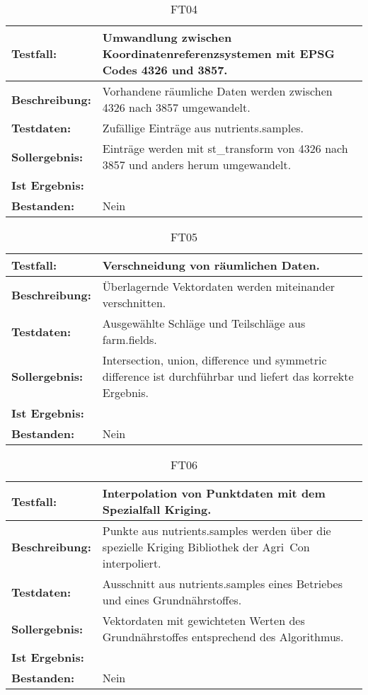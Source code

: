 \begin{table}[h!]
\centering
\small
\begin{tabular}{p{2.8cm}|p{12cm}}
\textbf{Testfall:} & Umwandlung zwischen Koordinatenreferenzsystemen mit EPSG Codes 4326 und 3857. \\ \hline
\textbf{Beschreibung:} & Vorhandene räumliche Daten werden zwischen 4326 nach 3857 umgewandelt. \\ \hline
\textbf{Testdaten:} & Zufällige Einträge aus nutrients.samples. \\ \hline
\textbf{Sollergebnis:} & Einträge werden mit st\_{}transform von 4326 nach 3857 und anders herum umgewandelt. \\ \hline
\textbf{Ist Ergebnis:} &  \\ \hline
\textbf{Bestanden:} & Nein \\
\end{tabular}
\caption*{FT04}
\end{table}

\begin{table}[h!]
\centering
\small
\begin{tabular}{p{2.8cm}|p{12cm}}
\textbf{Testfall:} & Verschneidung von räumlichen Daten. \\ \hline
\textbf{Beschreibung:} & Überlagernde Vektordaten werden miteinander verschnitten. \\ \hline
\textbf{Testdaten:} & Ausgewählte Schläge und Teilschläge aus farm.fields. \\ \hline
\textbf{Sollergebnis:} & Intersection, union, difference und symmetric difference ist durchführbar und liefert das korrekte Ergebnis. \\ \hline
\textbf{Ist Ergebnis:} &  \\ \hline
\textbf{Bestanden:} & Nein \\
\end{tabular}
\caption*{FT05}
\end{table}

\begin{table}[h!]
\centering
\small
\begin{tabular}{p{2.8cm}|p{12cm}}
\textbf{Testfall:} & Interpolation von Punktdaten mit dem Spezialfall Kriging. \\ \hline
\textbf{Beschreibung:} & Punkte aus nutrients.samples werden über die spezielle Kriging Bibliothek der Agri~Con interpoliert. \\ \hline
\textbf{Testdaten:} & Ausschnitt aus nutrients.samples eines Betriebes und eines Grundnährstoffes. \\ \hline
\textbf{Sollergebnis:} & Vektordaten mit gewichteten Werten des Grundnährstoffes entsprechend des Algorithmus. \\ \hline
\textbf{Ist Ergebnis:} &  \\ \hline
\textbf{Bestanden:} & Nein \\
\end{tabular}
\caption*{FT06}
\end{table}

